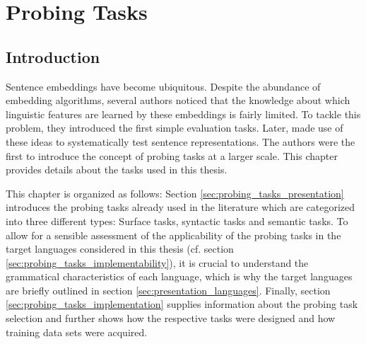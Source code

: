 %
%

\section{Probing Tasks}
\label{sec:probing_tasks}

\subsection{Introduction}
\label{sec:probing_tasks_intro}

Sentence embeddings have become ubiquitous. Despite the abundance of embedding algorithms, several authors \citep[inter alia]{Adi.2017, Zhu.2018,Veldhoen.2016} noticed that the knowledge about which linguistic features are learned by these embeddings is fairly limited. To tackle this problem,  they introduced the first simple evaluation tasks. Later, \citep{Conneau.2018a} made use of these ideas to systematically test sentence representations. The authors were the first to introduce the concept of probing tasks at a larger scale. This chapter provides details about the tasks used in this thesis.

This chapter is organized as follows: Section \vref{sec:probing_tasks_presentation} introduces the probing tasks already used in the literature which are categorized into three different types: Surface tasks, syntactic tasks and semantic tasks. To allow for a sensible assessment of the applicability of the probing tasks in the target languages considered in this thesis (cf. section \vref{sec:probing_tasks_implementability}), it is crucial to understand the grammatical characteristics of each language, which is why the target languages are briefly outlined in section \vref{sec:presentation_languages}. Finally, section \vref{sec:probing_tasks_implementation} supplies information about the probing task selection and further shows how the respective tasks were designed and how training data sets were acquired.

